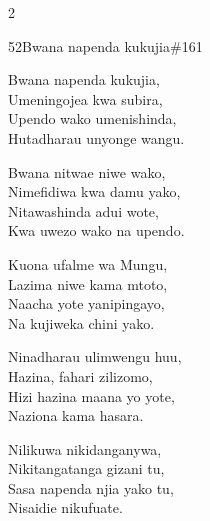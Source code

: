 \documentclass{article}
\begin{document}
\begin{multicols}{2}
\begin{hymn}{52}{Bwana napenda kukujia}{\#161}
\begin{stanza}
Bwana napenda kukujia,\\
Umeningojea kwa subira,\\
Upendo wako umenishinda,\\
Hutadharau unyonge wangu.
\end{stanza}
\begin{chorus}
Bwana nitwae niwe wako,\\
Nimefidiwa kwa damu yako,\\
Nitawashinda adui wote,\\
Kwa uwezo wako na upendo.
\end{chorus}
\begin{stanza}
Kuona ufalme wa Mungu,\\
Lazima niwe kama mtoto,\\
Naacha yote yanipingayo,\\
Na kujiweka chini yako.
\end{stanza}
\begin{stanza}
Ninadharau ulimwengu huu,\\
Hazina, fahari zilizomo,\\
Hizi hazina maana yo yote,\\
Naziona kama hasara.
\end{stanza}
\begin{stanza}
Nilikuwa nikidanganywa,\\
Nikitangatanga gizani tu,\\
Sasa napenda njia yako tu,\\
Nisaidie nikufuate.
\end{stanza}
\end{hymn}


\end{multicols}
\end{document}

